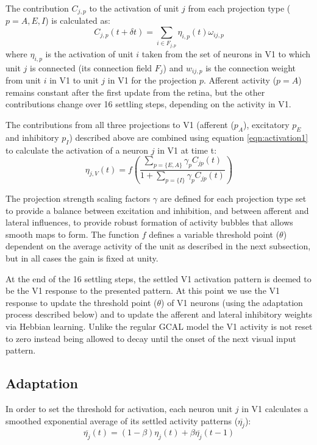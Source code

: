 The contribution $C_{j,p}$ to the activation of unit $j$ from each
projection type ($p=A,E,I$) is calculated as:
\begin{equation}
C_{j,p}(t+\delta t)=\sum_{i\in F_{j,p}}\eta_{i, p}(t)\omega_{ij,p}
\label{eqn:update}
\end{equation}
where $\eta_{i, p}$ is the activation of unit $i$ taken from the set
of neurons in V1 to which unit $j$ is connected (its connection field
$F_j$) and $w_{ij,p}$ is the connection weight from unit $i$ in V1 to
unit $j$ in V1 for the projection $p$. Afferent activity ($p=A$)
remains constant after the first update from the retina, but the other
contributions change over 16 settling steps, depending on the activity
in V1.

The contributions from all three projections to V1 (afferent
($p_{A}$), excitatory $p_{E}$ and inhibitory $p_{I}$) described above
are combined using equation \ref{eqn:activation1} to calculate the
activation of a neuron $j$ in V1 at time t:
\begin{equation}
\eta_{j,V}(t)=f\left(\frac{\sum_{p=\{E, A\}}\gamma_{p}C_{jp}(t)}{1+\sum_{p=\{I\}}\gamma_{p}C_{jp}(t)}\right)
\label{eqn:activation1}
\end{equation}

The projection strength scaling factors $\gamma$ are defined for each
projection type set to provide a balance between excitation and
inhibition, and between afferent and lateral influences, to provide
robust formation of activity bubbles that allows smooth maps to
form. The function $f$ defines a variable threshold point ($\theta$)
dependent on the average activity of the unit as described in the next
subsection, but in all cases the gain is fixed at unity.

At the end of the 16 settling steps, the settled V1 activation pattern
is deemed to be the V1 response to the presented pattern. At this
point we use the V1 response to update the threshold point ($\theta$)
of V1 neurons (using the adaptation process described below) and to
update the afferent and lateral inhibitory weights via Hebbian
learning. Unlike the regular GCAL model the V1 activity is not reset
to zero instead being allowed to decay until the onset of the next
visual input pattern.

\subsection*{Adaptation}

In order to set the threshold for activation, each neuron unit $j$ in
V1 calculates a smoothed exponential average of its settled activity
patterns ($\overline{\eta_{j}}$):
\begin{equation}
\overline{\eta_{j}}(t)= (1-\beta)\eta_{j}(t) + \beta\overline{\eta_{j}}(t-1)
\label{eqn:averaging}
\end{equation}

